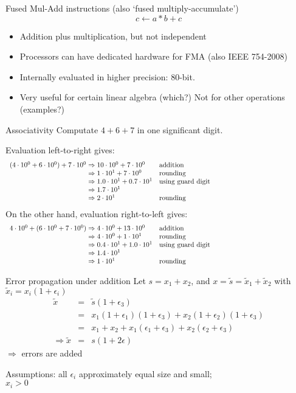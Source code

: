 \begin{numberedframe}{Fused Mul-Add instructions}
  (also `fused multiply-accumulate')
  \[ c\leftarrow a*b+c \]
  \begin{itemize}
  \item Addition plus multiplication, but not independent
  \item Processors can have dedicated hardware for FMA (also IEEE
    754-2008)
  \item Internally evaluated in higher precision: 80-bit.
  \item Very useful for certain linear algebra (which?) Not for other
    operations (examples?)
  \end{itemize}
  
\end{numberedframe}

\begin{numberedframe}{Associativity}
  Computate $4+6+7$ in one significant digit.
  
Evaluation left-to-right gives:
\[ 
\begin{array}{l@{{}\Rightarrow{}}lp{3in}}
(4\cdot10^0 + 6\cdot10^0)+7\cdot10^0&10\cdot10^0+7\cdot10^0&addition\\
&1\cdot 10^1 + 7\cdot10^0&rounding\\
&1.0\cdot 10^1 + 0.7\cdot10^1&using guard digit\\
&1.7\cdot 10^1\\
&2\cdot10^1&rounding
\end{array}
\]
On the other hand, evaluation right-to-left gives:
\[ 
\begin{array}{l@{{}\Rightarrow{}}lp{3in}}
4\cdot10^0 + (6\cdot10^0 + 7\cdot10^0)&4\cdot 10^0 + 13\cdot10^0&addition\\
&4\cdot 10^0 + 1\cdot10^1&rounding\\
&0.4\cdot 10^1 + 1.0\cdot10^1&using guard digit\\
&1.4\cdot 10^1\\
&1\cdot10^1&rounding
\end{array}
\]
\end{numberedframe}

\begin{numberedframe}{Error propagation under addition}
Let $s=x_1+x_2$, and $x=\tilde s=\tilde x_1+\tilde x_2$
with $\tilde x_i=x_i(1+\epsilon_i)$
\begin{eqnarray*}
\tilde x&=&\tilde s(1+\epsilon_3)\\
&=&x_1(1+\epsilon_1)(1+\epsilon_3)+x_2(1+\epsilon_2)(1+\epsilon_3)\\
&=&x_1+x_2+x_1(\epsilon_1+\epsilon_3)+x_2(\epsilon_2+\epsilon_3)\\
\Rightarrow\tilde x&=&s(1+2\epsilon)
\end{eqnarray*}
$\Rightarrow$ errors are added

Assumptions: all $\epsilon_i$ approximately equal size and small;\\
$x_i>0$
\end{numberedframe}

